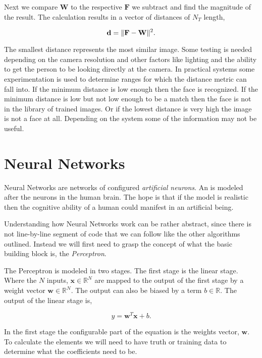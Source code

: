 Next we compare $\mathbf{W}$ to the respective $\mathbf{F}$ we subtract and find the magnitude of the result. The calculation results in a vector of distances of $N_T$ length,

\begin{equation}
\mathbf{d} = \| \mathbf{F}-\mathbf{W} \|^2.
\end{equation}	

The smallest distance represents the most similar image. Some testing is needed depending on the camera resolution and other factors like lighting and the ability to get the person to be looking directly at the camera. In practical systems some experimentation is used to determine ranges for which the distance metric can fall into. If the minimum distance is low enough then the face is recognized. If the minimum distance is low but not low enough to be a match then the face is not in the library of trained images. Or if the lowest distance is very high the image is not a face at all. Depending on the system some of the information may not be useful. 
	
\section{Neural Networks}

Neural Networks are networks of configured \emph{artificial neurons}. An  is modeled after the neurons in the human brain. The hope is that if the model is realistic then the cognitive ability of a human could manifest in an artificial being. 

Understanding how Neural Networks work can be rather abstract, since there is not line-by-line segment of code that we can follow like the other algorithms outlined. Instead we will first need to grasp the concept of what the basic building block is, the \emph{Perceptron}. 

The Perceptron is modeled in two stages. The first stage is the linear stage. Where the $N$ inputs, $\mathbf{x}\in \mathbb{R}^N$ are mapped to the output of the first stage by a weight vector $\mathbf{w}\in \mathbb{R}^{N}$. The output can also be biased by a term $b\in \mathbb{R}$. The output of the linear stage is,

\begin{equation}
y = \mathbf{w}^T\mathbf{x} + b.
\end{equation} 

In the first stage the configurable part of the equation is the weights vector, $\mathbf{w}$. To calculate the elements we will need to have truth or training data to determine what the coefficients need to be.

